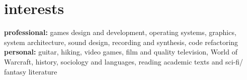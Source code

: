 \documentclass[]{friggeri-cv} %
\begin{document}

\section{interests}

\textbf{professional:} games design and development, operating systems, graphics, system architecture, sound design, recording and synthesis, code refactoring\\
\textbf{personal:} guitar, hiking, video games, film and quality television, World of Warcraft, history, sociology and languages, reading academic texts and sci-fi/ fantasy literature


%
%
%
%
%
%

\end{document}
